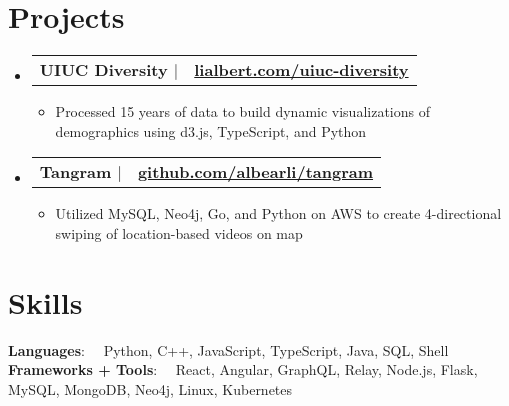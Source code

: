 \documentclass[letterpaper,11pt]{article}
\makeatletter
\newcommand{\resumeItem}[1]{
  \item\small{
    {#1 \vspace{-1pt}}
  }
}
\newcommand{\resumeProjectHeading}[2]{
  \vspace{-0pt}
    \item
    \begin{tabular*}{1\textwidth}{l@{\extracolsep{\fill}}r}
      \small\textbf{#1} & \small{\color{main}\textbf{#2}} \\
    \end{tabular*}\vspace{-7pt}
}
\newcommand{\resumeSubHeadingListStart}{\begin{itemize}[leftmargin=0in, label={}]}
\newcommand{\resumeSubHeadingListEnd}{\end{itemize}}
\newcommand{\resumeItemListStart}{\begin{itemize}}
\newcommand{\resumeItemListEnd}{\end{itemize}\vspace{0pt}}
\makeatother
\begin{document}
\section{Projects}
\resumeSubHeadingListStart
\resumeProjectHeading
{UIUC Diversity $|$ \color{secondary}{Data visualization showing racial disparities of every major}}
{\small{\href{https://lialbert.com/uiuc-diversity}{lialbert.com/uiuc-diversity}}}
\resumeItemListStart
\resumeItem{Processed 15 years of data to build dynamic visualizations of demographics using d3.js, TypeScript, and Python}
\resumeItemListEnd

\resumeProjectHeading
{Tangram $|$ \color{secondary}{Android/iOS social media app with hyperlocal video feeds}}
{\small{\href{https://github.com/albearli/tangram}{github.com/albearli/tangram}}}
\resumeItemListStart
\resumeItem{Utilized MySQL, Neo4j, Go, and Python on AWS to create 4-directional swiping of location-based videos on map}
\resumeItemListEnd
\resumeSubHeadingListEnd

\section{Skills}
\vspace{-4pt}
\begin{itemize}[leftmargin=0in, label={}]
  \small{\item{
        \textbf{\hspace{13.77mm}  Languages}{: \ \ Python, C++, JavaScript, TypeScript, Java, SQL, Shell} \\
        \textbf{Frameworks + Tools}{: \ \ React, Angular, GraphQL, Relay, Node.js, Flask, MySQL, MongoDB, Neo4j, Linux, Kubernetes}}}
\end{itemize}

\end{document}
